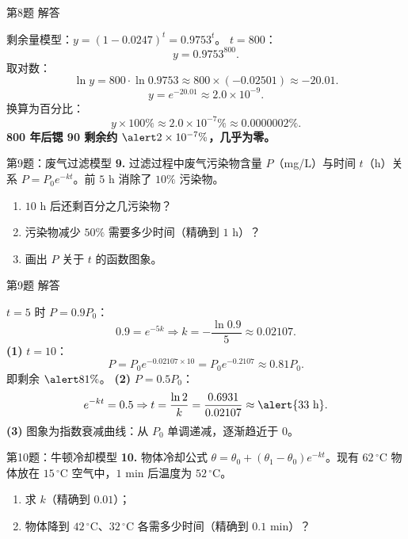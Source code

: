 \documentclass[10pt,aspectratio=169,serif]{beamer}
\begin{document}
\begin{frame}[t]{第8题 解答}
\begin{tcolorbox}[colback=orange!10,colframe=orange,title=\textbf{解}]
剩余量模型：$y=(1-0.0247)^{t}=0.9753^{t}$。
$t=800$：
\[
y=0.9753^{800}.
\]
取对数：
\[
\ln y=800\cdot\ln 0.9753\approx 800\times(-0.02501)\approx -20.01.
\]
\[
y=e^{-20.01}\approx 2.0\times 10^{-9}.
\]
换算为百分比：
\[
y\times 100\%\approx 2.0\times 10^{-7}\%\approx 0.0000002\%.
\]
\textbf{800 年后锶 90 剩余约 } $\alert{2\times 10^{-7}\%}$\textbf{，几乎为零。}
\end{tcolorbox}
\end{frame}

\begin{frame}[t]{第9题：废气过滤模型}
\textbf{9.} 过滤过程中废气污染物含量 $P$（mg/L）与时间 $t$（h）关系 $P=P_{0}e^{-kt}$。前 $5$ h 消除了 $10\%$ 污染物。
\begin{enumerate}[(1)]
  \item $10$ h 后还剩百分之几污染物？
  \item 污染物减少 $50\%$ 需要多少时间（精确到 $1$ h）？
  \item 画出 $P$ 关于 $t$ 的函数图象。
\end{enumerate}
\end{frame}

\begin{frame}[t]{第9题 解答}
\begin{tcolorbox}[colback=orange!10,colframe=orange,title=\textbf{解}]
$t=5$ 时 $P=0.9P_{0}$：
\[
0.9=e^{-5k}\Rightarrow k=-\frac{\ln 0.9}{5}\approx 0.02107.
\]
\textbf{(1)} $t=10$：
\[
P=P_{0}e^{-0.02107\times 10}=P_{0}e^{-0.2107}\approx 0.81P_{0}.
\]
即剩余 $\alert{81\%}$。
\smallskip
\textbf{(2)} $P=0.5P_{0}$：
\[
e^{-kt}=0.5\Rightarrow t=\frac{\ln 2}{k}=\frac{0.6931}{0.02107}\approx \alert{33\ \text{h}}.
\]
\smallskip
\textbf{(3)} 图象为指数衰减曲线：从 $P_{0}$ 单调递减，逐渐趋近于 $0$。
\end{tcolorbox}
\end{frame}

\begin{frame}[t]{第10题：牛顿冷却模型}
\textbf{10.} 物体冷却公式 $\theta=\theta_{0}+(\theta_{1}-\theta_{0})e^{-kt}$。现有 $62\,^{\circ}\text{C}$ 物体放在 $15\,^{\circ}\text{C}$ 空气中，$1$ min 后温度为 $52\,^{\circ}\text{C}$。
\begin{enumerate}[(1)]
  \item 求 $k$（精确到 $0.01$）；
  \item 物体降到 $42\,^{\circ}\text{C}$、$32\,^{\circ}\text{C}$ 各需多少时间（精确到 $0.1$ min）？
\end{enumerate}
\end{frame}
\end{document}
